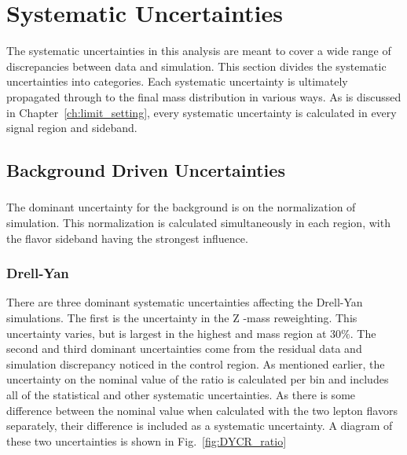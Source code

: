 \section{Systematic Uncertainties}

The systematic uncertainties in this analysis are meant to cover a wide range of discrepancies between data and simulation. This section divides the systematic uncertainties into categories. Each systematic uncertainty is ultimately propagated through to the final \WR mass distribution in various ways. As is discussed in Chapter~\ref{ch:limit_setting}, every systematic uncertainty is calculated in every signal region and sideband.

\subsection{Background Driven Uncertainties}
\subsubsection{\ttbar}
The dominant uncertainty for the \ttbar background is on the normalization of \ttbar simulation. This normalization is calculated simultaneously in each region, with the flavor sideband having the strongest influence.

\subsubsection{Drell-Yan}
There are three dominant systematic uncertainties affecting the Drell-Yan simulations. The first is the uncertainty in the Z \pt-mass reweighting. This uncertainty varies, but is largest in the highest \pt and mass region at $30\%$. The second and third dominant uncertainties come from the residual data and simulation discrepancy noticed in the control region. As mentioned earlier, the uncertainty on the nominal value of the ratio is calculated per bin and includes all of the statistical and other systematic uncertainties. As there is some difference between the nominal value when calculated with the two lepton flavors separately, their difference is included as a systematic uncertainty. A diagram of these two uncertainties is shown in Fig.~\ref{fig:DYCR_ratio}

